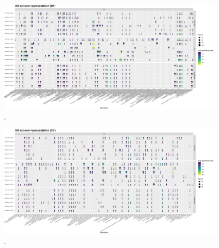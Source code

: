 \documentclass[]{article}
\begin{document}
\begin{figure}
	\centering
	\includegraphics[scale=0.4]{./Images/Yeast/goEnrichmentCompBP.png}
	\caption{.}
	\label{fig:yeastGOBP}
\end{figure}

\begin{figure}
	\centering
	\includegraphics[scale=0.4]{./Images/Yeast/goEnrichmentCompCC.png}
	\caption{.}
	\label{fig:yeastGOCC}
\end{figure}


  
\end{document}

